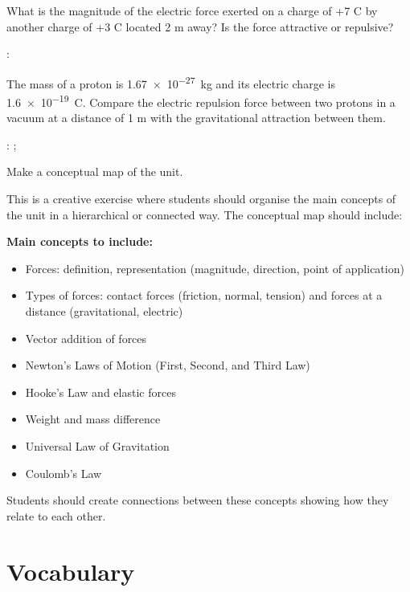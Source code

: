 \begin{exercise}
    What is the magnitude of the electric force exerted on a charge of +7 C by another charge of +3 C located 2 m away?
    Is the force attractive or repulsive?

    \datos{}: \ctecoulomb

\end{exercise}

\begin{exercise}
    The mass of a proton is \qty{1.67e-27}{\kilo\g} and its electric charge is \qty{1.6e-19}{\coulomb}.
    Compare the electric repulsion force between two protons in a vacuum at a distance of 1 m with the gravitational attraction between them.

    \datos{}: \ctecoulomb; \Ggravitacion

\end{exercise}


\begin{exercise}
    Make a conceptual map of the unit.
    \begin{solu}
        This is a creative exercise where students should organise the main concepts of the unit in a hierarchical or connected way. The conceptual map should include:

        \textbf{Main concepts to include:}
        \begin{itemize}
            \item Forces: definition, representation (magnitude, direction, point of application)
            \item Types of forces: contact forces (friction, normal, tension) and forces at a distance (gravitational, electric)
            \item Vector addition of forces
            \item Newton's Laws of Motion (First, Second, and Third Law)
            \item Hooke's Law and elastic forces
            \item Weight and mass difference
            \item Universal Law of Gravitation
            \item Coulomb's Law
        \end{itemize}
        Students should create connections between these concepts showing how they relate to each other.
    \end{solu}
\end{exercise}


\section{Vocabulary}

